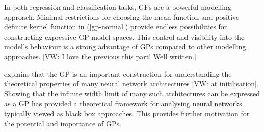 \documentclass{article}
\newcommand{\vw}[1]{{\color{green} [VW: #1]}}
\numberwithin{equation}{section}
\begin{document}
In both regression and classification tasks, GPs are a powerful modelling approach. Minimal restrictions for choosing the mean function and positive definite kernel function in (\ref{gp-normal}) provide endless possibilities for constructing expressive GP model spaces. This control and visibility into the model's behaviour is a strong advantage of GPs compared to other modelling approaches. \vw{I love the previous this part! Well written.}

\cite{novak2019neural} explains that the GP is an important construction for understanding the theoretical properties of many neural network architectures \vw{at initilisation}. Showing that the infinite width limit of many such architectures can be expressed as a GP has provided a theoretical framework for analysing neural networks typically viewed as black box approaches. This provides further motivation for the potential and importance of GPs.
\end{document}
